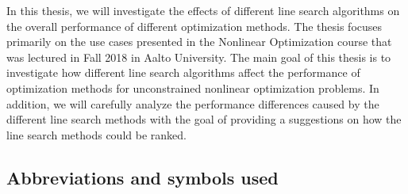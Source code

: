 \documentclass[a4paper,english,titlepage,12pt]{article}
\begin{document}
In this thesis, we will investigate the effects of different line search algorithms on the overall performance of different optimization methods.
The thesis focuses primarily on the use cases presented in the Nonlinear Optimization course that was lectured in Fall 2018 in Aalto University.
The main goal of this thesis is to investigate  how different line search algorithms affect the performance of optimization methods for unconstrained nonlinear optimization problems.
In addition, we will carefully analyze the performance differences caused by the different line search methods with the goal of providing a suggestions on how the line search methods could be ranked.

\subsection*{Abbreviations and symbols used}
\end{document}
